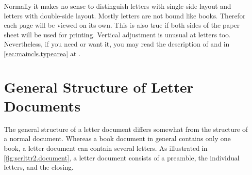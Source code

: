 



Normally it makes no sense to distinguish letters with single-side layout and
letters with double-side layout. Mostly letters are not bound like
books. Therefor each page will be viewed on its own. This is also true if both
sides of the paper sheet will be used for printing. Vertical adjustment is
unusual at letters too. Nevertheless, if you need or want it, you may read the
description of  and  in
\autoref{sec:maincls.typearea} at .%
%
\EndIndexGroup


\section{General Structure of Letter Documents}
\BeginIndexGroup
{}

The general structure of a letter document differs somewhat from the
structure of a normal document. Whereas a book document in general
contains only one book, a letter document can contain several
letters. As illustrated in \autoref{fig:scrlttr2.document}, a letter
document consists of a preamble, the individual letters, and the
closing.

